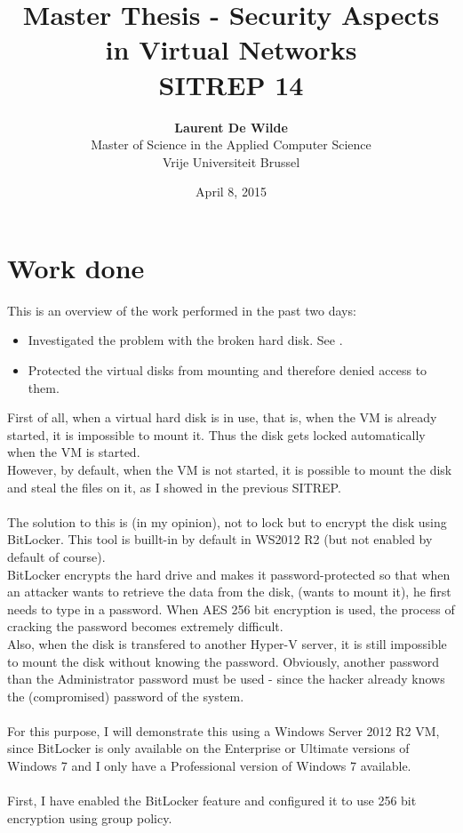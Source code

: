 \documentclass[11pt, a4paper]{article}
\title{Master Thesis -  Security Aspects in Virtual Networks\\ \textbf{SITREP 14}}
\author{\textbf{Laurent De Wilde} \\ Master of Science in the Applied Computer Science \\ Vrije Universiteit Brussel}
\date{April 8, 2015}
\begin{document}
\maketitle

\section*{Work done}

This is an overview of the work performed in the past two days:
\begin{itemize}
\item Investigated the problem with the broken hard disk. See .
\item Protected the virtual disks from mounting and therefore denied access to them.
\end{itemize}
First of all, when a virtual hard disk is in use, that is, when the VM is already started, it is impossible to mount it. Thus the disk gets locked automatically when the VM is started. \\
However, by default, when the VM is not started, it is possible to mount the disk and steal the files on it, as I showed in the previous SITREP. \\ \\
The solution to this is (in my opinion), not to lock but to encrypt the disk using BitLocker. This tool is buillt-in by default in WS2012 R2 (but not enabled by default of course). \\
BitLocker encrypts the hard drive and makes it password-protected so that when an attacker wants to retrieve the data from the disk, (wants to mount it), he first needs to type in a password. When AES 256 bit encryption is used, the process of cracking the password becomes extremely difficult. \\
Also, when the disk is transfered to another Hyper-V server, it is still impossible to mount the disk without knowing the password. Obviously, another password than the Administrator password must be used - since the hacker already knows the (compromised) password of the system. \\ \\
For this purpose, I will demonstrate this using a Windows Server 2012 R2 VM, since BitLocker is only available on the Enterprise or Ultimate versions of Windows 7 and I only have a Professional version of Windows 7 available. \\ \\
First, I have enabled the BitLocker feature and configured it to use 256 bit encryption using group policy.
\end{document}
